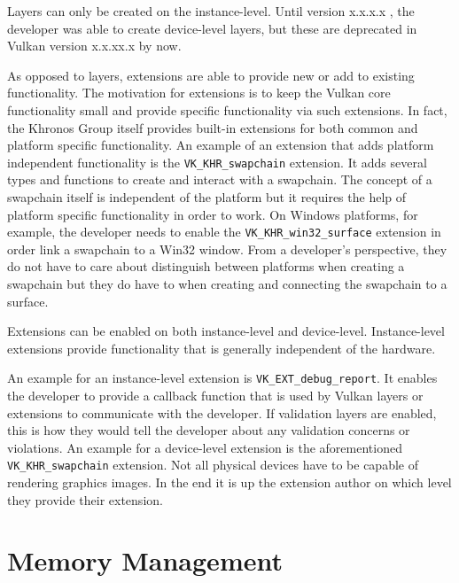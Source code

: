     Layers can only be created on the instance-level. Until version x.x.x.x , the developer was able to create device-level layers, but these are deprecated in Vulkan version x.x.xx.x by now.


    As opposed to layers, extensions are able to provide new or add to existing functionality. The motivation for extensions is to keep the Vulkan core functionality small and provide specific functionality via such extensions. In fact, the Khronos Group itself provides built-in extensions for both common and platform specific functionality. An example of an extension that adds platform independent functionality is the \lstinline{VK_KHR_swapchain} extension. It adds several types and functions to create and interact with a swapchain. The concept of a swapchain itself is independent of the platform but it requires the help of platform specific functionality in order to work. On Windows platforms, for example, the developer needs to enable the \lstinline{VK_KHR_win32_surface} extension in order link a swapchain to a Win32 window. From a developer's perspective, they do not have to care about distinguish between platforms when creating a swapchain but they do have to when creating and connecting the swapchain to a surface.

    Extensions can be enabled on both instance-level and device-level. Instance-level extensions provide functionality that is generally independent of the hardware.

    An example for an instance-level extension is \lstinline{VK_EXT_debug_report}. It enables the developer to provide a callback function that is used by Vulkan layers or extensions to communicate with the developer. If validation layers are enabled, this is how they would tell the developer about any validation concerns or violations. An example for a device-level extension is the aforementioned \lstinline{VK_KHR_swapchain} extension. Not all physical devices have to be capable of rendering graphics images. In the end it is up the extension author on which level they provide their extension.

  \section{Memory Management}

